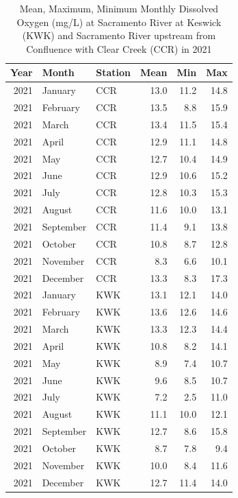 \documentclass[
]{book}
\theoremstyle{definition}
\theoremstyle{definition}
\theoremstyle{definition}
\theoremstyle{definition}
\theoremstyle{remark}
\begin{document}
\begin{table}
\centering
\caption{Mean, Maximum, Minimum Monthly Dissolved Oxygen (mg/L) at Sacramento River at Keswick (KWK) and Sacramento River upstream from Confluence with Clear Creek (CCR)  in 2021}
\centering
\begin{tabular}[t]{rllrrr}
\hline
Year & Month & Station & Mean & Min & Max\\
\hline
2021 & January & CCR & 13.0 & 11.2 & 14.8\\
\hline
2021 & February & CCR & 13.5 & 8.8 & 15.9\\
\hline
2021 & March & CCR & 13.4 & 11.5 & 15.4\\
\hline
2021 & April & CCR & 12.9 & 11.1 & 14.8\\
\hline
2021 & May & CCR & 12.7 & 10.4 & 14.9\\
\hline
2021 & June & CCR & 12.9 & 10.6 & 15.2\\
\hline
2021 & July & CCR & 12.8 & 10.3 & 15.3\\
\hline
2021 & August & CCR & 11.6 & 10.0 & 13.1\\
\hline
2021 & September & CCR & 11.4 & 9.1 & 13.8\\
\hline
2021 & October & CCR & 10.8 & 8.7 & 12.8\\
\hline
2021 & November & CCR & 8.3 & 6.6 & 10.1\\
\hline
2021 & December & CCR & 13.3 & 8.3 & 17.3\\
\hline
2021 & January & KWK & 13.1 & 12.1 & 14.0\\
\hline
2021 & February & KWK & 13.6 & 12.6 & 14.6\\
\hline
2021 & March & KWK & 13.3 & 12.3 & 14.4\\
\hline
2021 & April & KWK & 10.8 & 8.2 & 14.1\\
\hline
2021 & May & KWK & 8.9 & 7.4 & 10.7\\
\hline
2021 & June & KWK & 9.6 & 8.5 & 10.7\\
\hline
2021 & July & KWK & 7.2 & 2.5 & 11.0\\
\hline
2021 & August & KWK & 11.1 & 10.0 & 12.1\\
\hline
2021 & September & KWK & 12.7 & 8.6 & 15.8\\
\hline
2021 & October & KWK & 8.7 & 7.8 & 9.4\\
\hline
2021 & November & KWK & 10.0 & 8.4 & 11.6\\
\hline
2021 & December & KWK & 12.7 & 11.4 & 14.0\\
\hline
\end{tabular}
\end{table}
\end{document}
